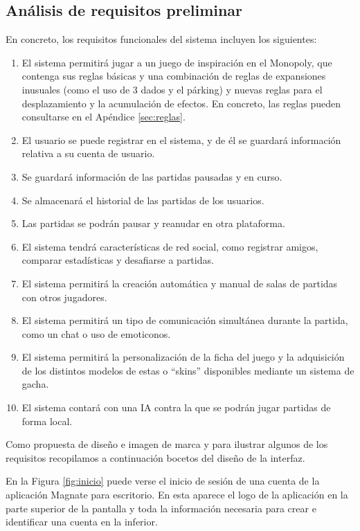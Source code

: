 \documentclass[11pt]{article}
\begin{document}
\subsection{Análisis de requisitos preliminar}
En concreto, los requisitos funcionales del sistema incluyen los siguientes:
\begin{enumerate}
\item El sistema permitirá jugar a un juego de inspiración en el Monopoly, que
contenga sus reglas básicas y una combinación de reglas de expansiones
inusuales (como el uso de 3 dados y el párking) y nuevas reglas para el
desplazamiento y la acumulación de efectos. En concreto, las reglas pueden
consultarse en el Apéndice \ref{sec:reglas}.
\item El usuario se puede registrar en el sistema, y de él se guardará 
información relativa a su cuenta de usuario.
\item Se guardará información de las partidas pausadas y en curso. 
\item Se almacenará el historial de las partidas de los usuarios.
\item Las partidas se podrán pausar y reanudar en otra plataforma.
\item El sistema tendrá características de red social, como registrar
		amigos, comparar estadísticas y desafiarse a partidas.
\item El sistema permitirá la creación automática y manual de salas de 
		partidas con otros jugadores.
\item El sistema permitirá un tipo de comunicación simultánea durante la
		partida, como un chat o uso de emoticonos.
\item El sistema permitirá la personalización de la ficha del juego y la
		adquisición de los distintos modelos de estas o ``skins'' disponibles
		mediante un sistema de gacha.
\item El sistema contará con una IA contra la que se podrán jugar partidas de
		forma local.
\end{enumerate}

Como propuesta de diseño e imagen de marca 
y para ilustrar algunos de los requisitos 
recopilamos a continuación bocetos del diseño de la interfaz.

En la Figura \ref{fig:inicio} puede verse el inicio de sesión de una cuenta
de la aplicación Magnate para escritorio. En esta aparece el logo de la 
aplicación en la parte superior de la pantalla y toda la información
necesaria para crear e identificar una cuenta en la inferior.
\end{document}
